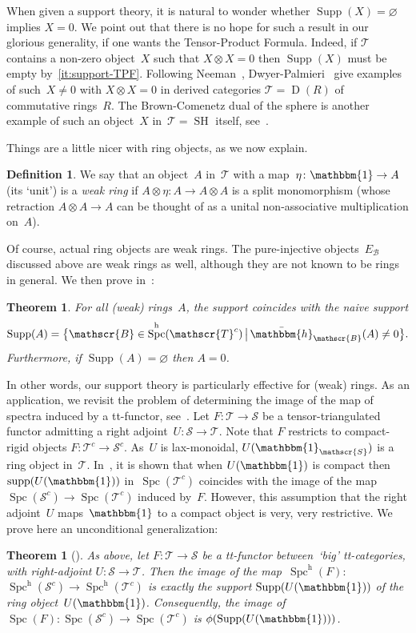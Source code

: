 \documentclass[JEP,XML,SOM,Unicode]{cedram}
\numberwithin{equation}{section}
\newtheorem{Thm}[equation]{Theorem}
\theoremstyle{definition}
\newtheorem{Def}[equation]{Definition}
\DeclareMathOperator{\supp}{supp}
\DeclareMathOperator{\Spc}{Spc}
\newcommand{\cat}[1]{\mathscr{#1}}
\newcommand{\SET}[2]{\big\{#1\,\big|\,#2\big\}}
\newcommand{\unit}{\mathbbm{1}}
\DeclareMathOperator{\Der}{D}
\DeclareMathOperator{\SH}{SH}
\newcommand{\smallh}{\mathrm{h}}
\DeclareMathOperator{\Supp}{Supp}
\newcommand{\boneda}{\bar\yoneda}
\newcommand{\cB}{\cat{B}}
\newcommand{\cS}{\cat{S}}
\newcommand{\cT}{\cat{T}}
\newcommand{\EB}{E_{\cB}}
\newcommand{\hB}{\boneda_{\cB}}
\newcommand{\SpchS}{\Spch(\cat{S}^c)}
\newcommand{\SpchT}{\Spch(\cat{T}^c)}
\newcommand{\Spch}{\Spc^{\smallh}}
\newcommand{\SpcS}{\Spc(\cat{S}^c)}
\newcommand{\SpcT}{\Spc(\cat{T}^c)}
\newcommand{\yoneda}{\mathbbm{h}}
\begin{document}
When given a support theory, it is natural to wonder whether $\Supp(X)=\varnothing$ implies $X=0$. We point out that there is no hope for such a result in our glorious generality, if one wants the Tensor-Product Formula. Indeed, if $\cT$ contains a non-zero object~$X$ such that $X\otimes X=0$ then $\Supp(X)$ must be empty by~\eqref{it:support-TPF}. Following Neeman~\cite{Neeman00}, Dwyer-Palmieri~\cite[Th.\,B]{DwyerPalmieri08} give examples of such~$X\neq0$ with $X\otimes X=0$ in derived categories $\cT=\Der(R)$ of commutative rings~$R$. The Brown-Comenetz dual of the sphere is another example of such an object~$X$ in~$\cT=\SH$ itself, see~\cite[\S7]{HoveyStrickland99}.

Things are a little nicer with ring objects, as we now explain.

\begin{Def}
\label{Def:weak-ring}
We say that an object~$A$ in~$\cT$ with a map~$\eta\colon \unit\to A$ (its `unit') is a \emph{weak ring} if $A\otimes\eta\colon A\to A\otimes A$ is a split monomorphism (whose retraction $A\otimes A\to A$ can be thought of as a unital non-associative multiplication on~$A$).
\end{Def}

Of course, actual ring objects are weak rings. The pure-injective objects~$\EB$ discussed above are weak rings as well, although they are not known to be rings in general. We then prove in~:
\begin{Thm}
\label{Thm:rings-intro}
For all (weak) rings~$A$, the support coincides with the naive support
\[
\Supp(A)=\SET{\cB\in\SpchT}{\hB(A)\neq 0}.
\]
Furthermore, if $\Supp(A)=\varnothing$ then $A=0$.
\end{Thm}

In other words, our support theory is particularly effective for (weak) rings. As an application, we revisit the problem of determining the image of the map of spectra induced by a tt-functor, see~\cite{Balmer18a}. Let $F\colon \cT\to \cS$ be a tensor-triangulated functor admitting a right adjoint~$U\colon \cS\to \cT$. Note that $F$ restricts to compact-rigid objects $F\colon\cT^c\to \cS^c$. As~$U$ is lax-monoidal, $U(\unit_\cS)$ is a ring object in~$\cT$. In~\cite{Balmer18a}, it is shown that when $U(\unit)$ is compact then $\supp(U(\unit))$ in~$\SpcT$ coincides with the image of the map $\SpcS\to \SpcT$ induced by~$F$. However, this assumption that the right adjoint~$U$ maps~$\unit$ to a compact object is very, very restrictive. We prove here an unconditional generalization:
\begin{Thm}[{}]
\label{Thm:Spc-image-intro}
As above, let $F\colon \cT\to \cS$ be a tt-functor between~`big' tt\nobreakdash-categories, with right-adjoint $U\colon \cS\to \cT$. Then the image of the map~$\Spch(F)\colon$ $\SpchS\to \SpchT$ is exactly the support $\Supp(U(\unit))$ of the ring object~$U(\unit)$. Consequently, the image of $\Spc(F)\colon \SpcS\to \SpcT$ is $\phi(\Supp(U(\unit)))$.
\end{Thm}
\end{document}
